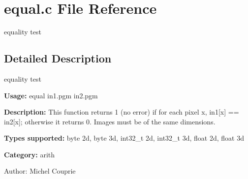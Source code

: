 \section{equal.c File Reference}
\label{equal_8c}
equality test 



\subsection{Detailed Description}
equality test 

{\bf Usage:} equal in1.pgm in2.pgm

{\bf Description:} This function returns 1 (no error) if for each pixel x, in1[x] == in2[x]; otherwise it returns 0. Images must be of the same dimensions.

{\bf Types supported:} byte 2d, byte 3d, int32\_\-t 2d, int32\_\-t 3d, float 2d, float 3d

{\bf Category:} arith

\begin{Desc}
\item[Author:]Michel Couprie \end{Desc}
